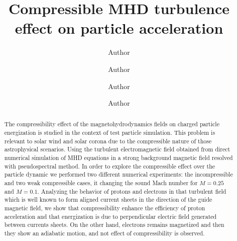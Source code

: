 \documentclass[%
aip,pop,amsmath,amssymb,
 reprint,%
]{revtex4-1}
\begin{document}



\title[]{Compressible MHD turbulence effect on particle acceleration}%
\author{Author}
 \
\author{Author}
\
\author{Author}
 \
\author{Author}
 \


\begin{abstract}
 The compressibility effect of the magnetohydrodynamics fields  on charged particle 
energization is studied in the context of test particle simulation. This problem is relevant 
to solar wind and solar corona due to the compressible nature of those astrophysical 
scenarios. Using the turbulent electromagnetic field obtained from  direct numerical simulation 
of MHD equations in a strong background magnetic field resolved with pseudospectral method.  
In order to explore the compressible effect over the particle dynamic we performed two 
different numerical experiments: the incompressible and two weak compressible cases, it 
changing the sound Mach number for $M=0.25$ and $M=0.1$. Analyzing  the behavior of protons 
and electrons in that turbulent field which is well known to form aligned current sheets in 
the direction of the guide magnetic field,  we show that compressibility enhance the 
efficiency of proton acceleration and that energization is due to perpendicular electric 
field generated between currents sheets. On the other hand, electrons remains magnetized and 
then they show an adiabatic motion, and not effect of compressibility is observed.
\end{abstract}

\maketitle

%
\end{document}
